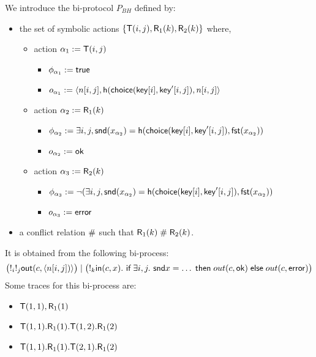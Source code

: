 \begin{example}
  \label{ex:basic-hash-bi-process}
  We introduce the bi-protocol $P_{BH}$ defined by:
  \begin{itemize}
    \item the set of symbolic actions $\{\textsf{T}(i,j),\textsf{R}_1(k),\textsf{R}_2(k)\}$ where,
    \begin{itemize}
      \item action $\alpha_1 := \textsf{T}(i,j)$
        \begin{itemize}
          \item $\phi_{\alpha_1} := \textsf{true}$
          \item $o_{\alpha_1} := \langle n[i,j], \mathsf{h}(\mathsf{choice}(\mathsf{key}[i],\mathsf{key}'[i,j]),n[i,j] \rangle$
        \end{itemize}
      \item action $\alpha_2 := \textsf{R}_1(k)$
        \begin{itemize}
          \item $\phi_{\alpha_2} := \exists i,j, \mathsf{snd}(x_{\alpha_2}) =  
            \mathsf{h}(\mathsf{choice}(\mathsf{key}[i],\mathsf{key}'[i,j]),\mathsf{fst}(x_{\alpha_2}))$
          \item $o_{\alpha_2} := \mathsf{ok}$
        \end{itemize}
      \item action $\alpha_3 := \textsf{R}_2(k)$
        \begin{itemize}
          \item $\phi_{\alpha_3} := \neg (\exists i,j, \mathsf{snd}(x_{\alpha_2}) =  \mathsf{h}(\mathsf{choice}(\mathsf{key}[i],\mathsf{key}'[i,j]),\mathsf{fst}(x_{\alpha_2}))$
          \item $o_{\alpha_3} := \mathsf{error}$
        \end{itemize}
    \end{itemize}
    \item a conflict relation $\mathrel{\#}$ such that $\textsf{R}_1(k)\mathrel{\#}\textsf{R}_2(k)$.
  \end{itemize}
  It is obtained from the following bi-process:
  $$\bigl(!_i !_j \textsf{out}(c,\langle  n[i,j]) \rangle\bigr) \mid
   \bigl(!_k \textsf{in}(c,x).~ \textsf{if}\; \exists i,j.~ \mathsf{snd}{x} = \ldots \;\textsf{then}\;
    out(c,\mathsf{ok}) \;\textsf{else}\; out(c,\mathsf{error})\bigr)$$
  Some traces for this bi-process are:
  \begin{itemize}
    \item $\textsf{T}(1,1),\textsf{R}_1(1)$
    \item $\textsf{T}(1,1).\textsf{R}_1(1).\textsf{T}(1,2).\textsf{R}_1(2)$
    \item $\textsf{T}(1,1).\textsf{R}_1(1).\textsf{T}(2,1).\textsf{R}_1(2)$
  \end{itemize}
\end{example}

